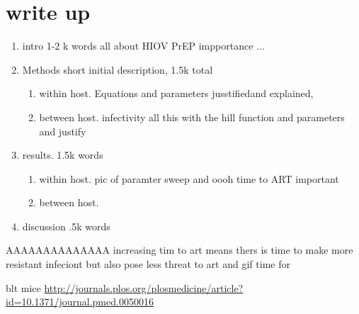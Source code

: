 \documentclass[DIV=15]{scrartcl}
\begin{document}
 
 
 \section*{write up}
 
\begin{enumerate}
\item intro 1-2 k words all about HIOV PrEP impportance ...
\item Methods short initial description, 1.5k total
\begin{enumerate}
\item within host. Equations and parameters jusstifiedand explained,

\item between host. infectivity all  this with the hill function and parameters and justify 



\end{enumerate}

\item results. 1.5k words
\begin{enumerate}
\item within host.  pic of paramter sweep and oooh time  to ART important 


\item between host. 

\end{enumerate}
\item discussion .5k words
\end{enumerate} 
 
 
 
 
 AAAAAAAAAAAAAA
   increasing tim to art means thers is time to make more resistant infeciont but also pose less threat to art and gif time for 
   
   
   blt mice \url{http://journals.plos.org/plosmedicine/article?id=10.1371/journal.pmed.0050016}
 
 
 \fi
 
 

 


 
\end{document}
